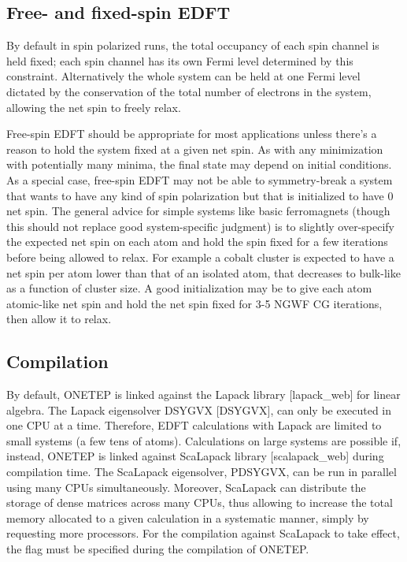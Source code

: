 \documentclass[letterpaper,10pt,english]{sphinxmanual}
\begin{document}
\subsection{Free- and fixed-spin EDFT}
\label{\detokenize{onetep_edft_documentation:free-and-fixed-spin-edft}}
By default in spin polarized runs, the total occupancy of each spin
channel is held fixed; each spin channel has its own Fermi level
determined by this constraint. Alternatively the whole system can be
held at one Fermi level dictated by the conservation of the total number
of electrons in the system, allowing the net spin to freely relax.

Free-spin EDFT should be appropriate for most applications unless
there’s a reason to hold the system fixed at a given net spin. As with
any minimization with potentially many minima, the final state may
depend on initial conditions. As a special case, free-spin EDFT may not
be able to symmetry-break a system that wants to have any kind of spin
polarization but that is initialized to have 0 net spin. The general
advice for simple systems like basic ferromagnets (though this should
not replace good system-specific judgment) is to slightly over-specify
the expected net spin on each atom and hold the spin fixed for a few
iterations before being allowed to relax. For example a cobalt cluster
is expected to have a net spin per atom lower than that of an isolated
atom, that decreases to bulk-like as a function of cluster size. A good
initialization may be to give each atom atomic-like net spin and hold
the net spin fixed for 3-5 NGWF CG iterations, then allow it to relax.


\subsection{Compilation}
\label{\detokenize{onetep_edft_documentation:compilation}}
By default, ONETEP is linked against the Lapack library
{[}lapack\_web{]} for linear algebra. The Lapack
eigensolver DSYGVX {[}DSYGVX{]}, can only be executed in
one CPU at a time. Therefore, EDFT calculations with Lapack are limited
to small systems (a few tens of atoms). Calculations on large systems
are possible if, instead, ONETEP is linked against ScaLapack library
{[}scalapack\_web{]} during compilation time. The ScaLapack
eigensolver, PDSYGVX, can be run in parallel using many CPUs
simultaneously. Moreover, ScaLapack can distribute the storage of dense
matrices across many CPUs, thus allowing to increase the total memory
allocated to a given calculation in a systematic manner, simply by
requesting more processors. For the compilation against ScaLapack to
take effect, the flag  must be specified during the
compilation of ONETEP.
\end{document}
